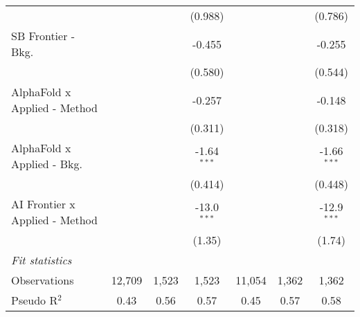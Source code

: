 \begin{tabular}{lcccccc}
                                  &                &               & (0.988)       &                &               & (0.786)\\   
   SB Frontier - Bkg.             &                &               & -0.455        &                &               & -0.255\\   
                                  &                &               & (0.580)       &                &               & (0.544)\\   
   AlphaFold x Applied - Method   &                &               & -0.257        &                &               & -0.148\\   
                                  &                &               & (0.311)       &                &               & (0.318)\\   
   AlphaFold x Applied - Bkg.     &                &               & -1.64$^{***}$ &                &               & -1.66$^{***}$\\   
                                  &                &               & (0.414)       &                &               & (0.448)\\   
   AI Frontier x Applied - Method &                &               & -13.0$^{***}$ &                &               & -12.9$^{***}$\\   
                                  &                &               & (1.35)        &                &               & (1.74)\\   
   \midrule
   \emph{Fit statistics}\\
   Observations                   & 12,709         & 1,523         & 1,523         & 11,054         & 1,362         & 1,362\\  
   Pseudo R$^2$                   & 0.43           & 0.56          & 0.57          & 0.45           & 0.57          & 0.58\\  
   

\end{tabular}
